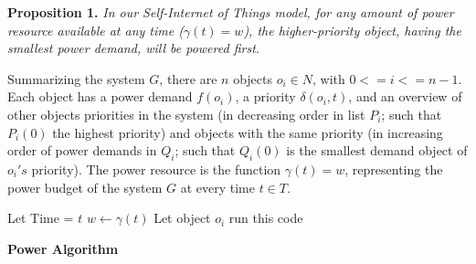 \documentclass[../main/Self-Stabilization.tex]{subfiles}
\begin{document}
\textbf{Proposition 1.} \emph{In our Self-Internet of Things model, for any amount of power resource available at any time ($\gamma(t)= w$), the higher-priority object, having the smallest power demand, will be powered first.}

Summarizing the system $G$, there are $n$ objects $o_{i}\in N$, with $0<=i<=n-1$. Each object has a power demand $f(o_{i})$, a priority $\delta(o_{i}, t)$, and an overview of other objects priorities in the system (in decreasing order in list $P_{i}$; such that $P_{i}(0)$ the highest priority) and objects with the same priority (in increasing order of power demands in $Q_{i}$; such that $Q_{i}(0)$ is the smallest demand object of $o_{i}'s$ priority). The power resource is the function $\gamma(t) = w$, representing the power budget of the system $G$ at every time $t \in T$.


\LinesNumbered
\IncMargin{1em}
\begin{algorithm}
Let Time = $t$ \newline
$w \gets \gamma(t)$ \newline
Let object $o_{i}$ run this code
\BlankLine
{}
\caption{\textbf{Power Algorithm}} \label{algo2}
\end{algorithm}
\DecMargin{1em}
\end{document}
